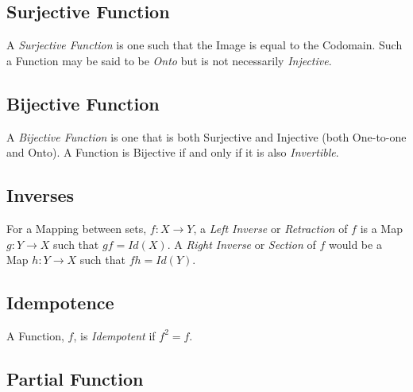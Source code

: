 \documentclass{article}
\begin{document}
\subsection{Surjective Function}\label{subsec:surjective_function}

A \emph{Surjective Function} is one such that the Image is equal to
the Codomain. Such a Function may be said to be \emph{Onto} but is not
necessarily \emph{Injective}.

\subsection{Bijective Function}\label{subsec:bijective_function}

A \emph{Bijective Function} is one that is both Surjective and
Injective (both One-to-one and Onto). A Function is Bijective if and
only if it is also \emph{Invertible}.

\subsection{Inverses}\label{subsec:inverse_functions}

For a Mapping between sets, $f: X \rightarrow Y$, a \emph{Left
  Inverse} or \emph{Retraction} of $f$ is a Map $g: Y \rightarrow X$
such that $gf = Id(X)$. A \emph{Right Inverse} or \emph{Section} of
$f$ would be a Map $h: Y \rightarrow X$ such that $fh = Id(Y)$.

\subsection{Idempotence}\label{subsec:idempotence}

A Function, $f$, is \emph{Idempotent} if $f^2 = f$.

\subsection{Partial Function}\label{subsec:partial_function}
\end{document}
